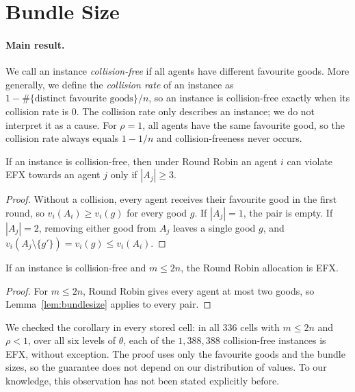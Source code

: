 \section{Bundle Size}\label{sec:bundlesize}

\paragraph{Main result.}
We call an instance \textit{collision-free} if all agents have different favourite goods. More generally, we define the \textit{collision rate} of an instance as $1-\#\{\text{distinct favourite goods}\}/n$, so an instance is collision-free exactly when its collision rate is $0$. The collision rate only describes an instance; we do not interpret it as a cause. For $\rho=1$, all agents have the same favourite good, so the collision rate always equals $1-1/n$ and collision-freeness never occurs.

\begin{lemma}\label{lem:bundlesize}
If an instance is collision-free, then under Round Robin an agent $i$ can violate EFX towards an agent $j$ only if $|A_j|\geq3$.
\end{lemma}

\begin{proof}
Without a collision, every agent receives their favourite good in the first round, so $v_i(A_i)\geq v_i(g)$ for every good $g$. If $|A_j|=1$, the pair is empty. If $|A_j|=2$, removing either good from $A_j$ leaves a single good $g$, and $v_i(A_j\setminus\{g'\})=v_i(g)\leq v_i(A_i)$.
\end{proof}

\begin{corollary}\label{cor:bundlesize}
If an instance is collision-free and $m\leq2n$, the Round Robin allocation is EFX.
\end{corollary}

\begin{proof}
For $m\leq2n$, Round Robin gives every agent at most two goods, so Lemma~\ref{lem:bundlesize} applies to every pair.
\end{proof}

We checked the corollary in every stored cell: in all $336$ cells with $m\leq2n$ and $\rho<1$, over all six levels of $\theta$, each of the $1{,}388{,}388$ collision-free instances is EFX, without exception. The proof uses only the favourite goods and the bundle sizes, so the guarantee does not depend on our distribution of values. To our knowledge, this observation has not been stated explicitly before.

